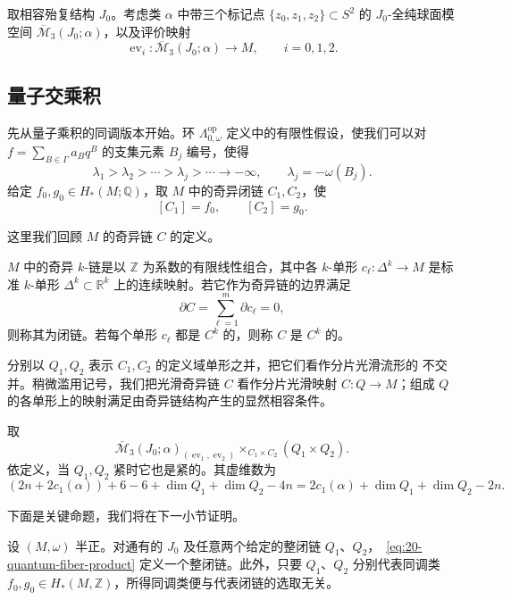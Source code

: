 取相容殆复结构 $J_0$。考虑类 $\alpha$ 中带三个标记点
$\{z_0,z_1,z_2\}\subset S^2$ 的 $J_0$-全纯球面模空间
$\overline{\mathcal M}_3(J_0;\alpha)$，以及评价映射
\[
 \operatorname{ev}_i:\overline{\mathcal M}_3(J_0;\alpha)\longrightarrow M,
 \qquad i=0,1,2.
\]

\subsection{量子交乘积}

先从量子乘积的同调版本开始。\personNovikov{}环
$\Lambda_{0,\omega}^{\mathrm{op}}$ 定义中的有限性假设，使我们可以对
$f=\sum_{B\in\Gamma}a_Bq^B$ 的支集元素 $B_j$ 编号，使得
\[
 \lambda_1>\lambda_2>\cdots>\lambda_j>\cdots\longrightarrow-\infty,
 \qquad \lambda_j=-\omega(B_j).
\]
给定 $f_0,g_0\in H_*(M;\mathbb Q)$，取 $M$ 中的奇异闭链 $C_1,C_2$，使
\[
 [C_1]=f_0,\qquad [C_2]=g_0.
\]

这里我们回顾 $M$ 的奇异链 $C$ 的定义。

\begin{definition}
\label{def:20-singular-chain}
$M$ 中的奇异 $k$-链是以 $\mathbb Z$ 为系数的有限线性组合，其中各
$k$-单形 $c_\ell:\Delta^k\to M$ 是标准 $k$-单形
$\Delta^k\subset\mathbb R^k$ 上的连续映射。若它作为奇异链的边界满足
\[
 \partial C=\sum_{\ell=1}^{m}\partial c_\ell=0,
\]
则称其为闭链。若每个单形 $c_\ell$ 都是 $C^k$ 的，则称 $C$ 是 $C^k$ 的。
\end{definition}

分别以 $Q_1,Q_2$ 表示 $C_1,C_2$ 的定义域单形之并，把它们看作分片光滑流形的
不交并。稍微滥用记号，我们把光滑奇异链 $C$ 看作分片光滑映射 $C:Q\to M$；组成
$Q$ 的各单形上的映射满足由奇异链结构产生的显然相容条件。

取\termFiberProduct{}
\begin{equation}
 \overline{\mathcal M}_3(J_0;\alpha)_{(\operatorname{ev}_1,\operatorname{ev}_2)}
 \times_{C_1\times C_2}(Q_1\times Q_2).
 \label{eq:20-quantum-fiber-product}
\end{equation}
依定义，当 $Q_1,Q_2$ 紧时它也是紧的。其虚维数为
\[
 (2n+2c_1(\alpha))+6-6+\dim Q_1+\dim Q_2-4n
 =2c_1(\alpha)+\dim Q_1+\dim Q_2-2n.
\]

下面是关键命题，我们将在下一小节证明。

\begin{proposition}
\label{prop:20-integral-cycle}
设 $(M,\omega)$ 半正。对通有的 $J_0$ 及任意两个给定的整闭链 $Q_1$、$Q_2$，\termFiberProduct{}~\eqref{eq:20-quantum-fiber-product} 定义一个整闭链。此外，只要 $Q_1$、$Q_2$
分别代表同调类 $f_0,g_0\in H_*(M,\mathbb Z)$，所得同调类便与代表闭链的选取无关。
\end{proposition}

